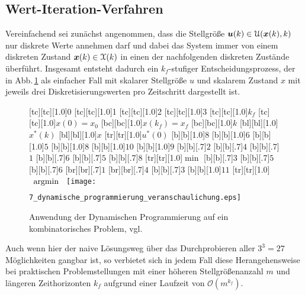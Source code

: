 \subsection{Wert-Iteration-Verfahren} \label{sec:wertiteratrion}
Vereinfachend sei zunächst angenommen, dass die Stellgröße $\boldsymbol{u}(k) \in \mathcal U(\boldsymbol{x}(k),k)$ nur diskrete Werte annehmen darf und dabei das System immer von einem diskreten Zustand $\boldsymbol{x}(k) \in \mathcal X(k)$ in einen der nachfolgenden diskreten Zustände überführt. Insgesamt entsteht dadurch ein $k_f$-stufiger Entscheidungsprozess, der in Abb.\,\ref{fig:dynamische_programmierung_veranschaulichung} als einfacher Fall mit skalarer Stellgröße $u$ und skalarem Zustand $x$ mit jeweils drei Diskretisierungswerten pro Zeitschritt %
dargestellt ist.
\begin{figure}[ht]
	[tc][tc][1.0]{0}
	[tc][tc][1.0]{1}
	[tc][tc][1.0]{2}
	[tc][tc][1.0]{3}
	[tc][tc][1.0]{$k_f$}
	[tc][tc][1.0]{$x(0) = x_0$}
	[bc][bc][1.0]{$x(k_f) = x_f$}
	[bc][bc][1.0]{$k$}
	[bl][bl][1.0]{$x^\ast(k)$}
	[bl][bl][1.0]{$x$}
	[tr][tr][1.0]{$u^\ast(0)$}
	[b][1.0]{$8$}
	[b][1.0]{$6$}
	[b][1.0]{$5$}
	[b][1.0]{$8$}
	[b][1.0]{$10$}
	[b][1.0]{$9$}
	[b][.7]{$2$}
	[b][.7]{$4$}
	[b][.7]{$1$}
	[b][.7]{$6$}
	[b][.7]{$5$}
	[b][.7]{$8$}
	[tr][tr][1.0]{$\min$}
	[b][.7]{$3$}
	[b][.7]{$5$}
	[b][.7]{$6$}
	[br][br][.7]{$1$}
	[br][br][.7]{$4$}
	[b][.7]{$3$}
	[b][1.0]{$11$}
	[tr][tr][1.0]{$\argmin{}$}
	\centering
  	\texttt{[image: 7\_dynamische\_programmierung\_veranschaulichung.eps]}
	\caption[Anwendungsbeispiel der Dynamischen Programmierung]{Anwendung der Dynamischen Programmierung auf ein kombinatorisches Problem, vgl.\ \cite{foellingeroptimal}}
	\label{fig:dynamische_programmierung_veranschaulichung}
\end{figure} 
Auch wenn hier der naive Lösungsweg über das Durchprobieren aller $3^3 = 27$ Möglichkeiten gangbar ist, so verbietet sich in jedem Fall diese Herangehensweise bei praktischen Problemstellungen mit einer höheren Stellgrößenanzahl $m$ und längeren Zeithorizonten $k_f$ aufgrund einer Laufzeit von  $\mathcal O(m^{k_f})$.

